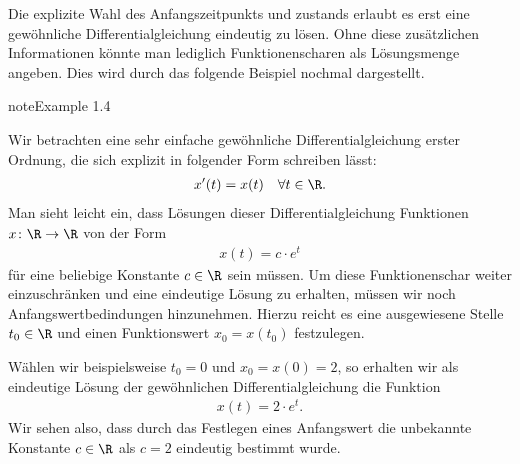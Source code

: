 \documentclass[letterpaper,10pt,german]{jupyterBook}
\begin{document}
\sphinxAtStartPar
Die explizite Wahl des Anfangszeitpunkts und \sphinxhyphen{}zustands erlaubt es erst eine gewöhnliche Differentialgleichung eindeutig zu lösen.
Ohne diese zusätzlichen Informationen könnte man lediglich Funktionenscharen als Lösungsmenge angeben.
Dies wird durch das folgende Beispiel nochmal dargestellt.
\label{ode/repetition:example-6}
\begin{sphinxadmonition}{note}{Example 1.4}



\sphinxAtStartPar
Wir betrachten eine sehr einfache gewöhnliche Differentialgleichung erster Ordnung, die sich explizit in folgender Form schreiben lässt:
\begin{equation*}
\begin{split}x'(t) = x(t) \quad \forall t \in \R.\end{split}
\end{equation*}
\sphinxAtStartPar
Man sieht leicht ein, dass Lösungen dieser Differentialgleichung Funktionen \(x \colon \R \rightarrow \R\) von der Form
\begin{equation*}
\begin{split}x(t) = c\cdot e^t\end{split}
\end{equation*}
\sphinxAtStartPar
für eine beliebige Konstante \(c \in \R\) sein müssen.
Um diese Funktionenschar weiter einzuschränken und eine eindeutige Lösung zu erhalten, müssen wir noch Anfangswertbedindungen hinzunehmen.
Hierzu reicht es eine ausgewiesene Stelle \(t_0 \in \R\) und einen Funktionswert \(x_0 = x(t_0)\) festzulegen.

\sphinxAtStartPar
Wählen wir beispielsweise \(t_0 = 0\) und \(x_0 = x(0) = 2\), so erhalten wir als eindeutige Lösung der gewöhnlichen Differentialgleichung die Funktion
\begin{equation*}
\begin{split}x(t) = 2\cdot e^t.\end{split}
\end{equation*}
\sphinxAtStartPar
Wir sehen also, dass durch das Festlegen eines Anfangswert die unbekannte Konstante \(c \in \R\) als \(c=2\) eindeutig bestimmt wurde.
\end{sphinxadmonition}
\end{document}
